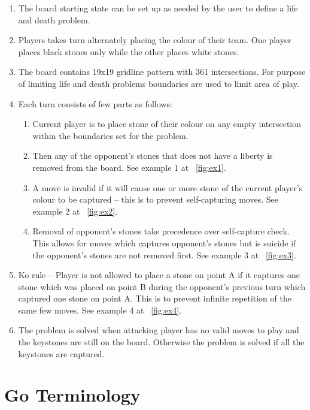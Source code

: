 \documentclass{l4proj}
\begin{document}
\begin{enumerate}
  \item The board starting state can be set up as needed by the user to define a life and death problem.
  \item 	Players takes turn alternately placing the colour of their team. One player places black stones only while the other places white stones.
  \item The board contains 19x19 gridline pattern with 361 intersections. For purpose of limiting life and death problems boundaries are used to limit area of play.
  \item Each turn consists of few parts as follows:
  	\begin{enumerate}[label={(\alph*)}]
		\item Current player is to place stone of their colour on any empty intersection within the boundaries set for the problem.
		\item Then any of the opponent’s stones that does not have a liberty is removed from the board. See example 1 at ~\autoref{fig:ex1}.
		\item A move is invalid if it will cause one or more stone of the current player’s colour to be captured – this is to prevent self-capturing moves. See example 2 at ~\autoref{fig:ex2}.
		\item Removal of opponent’s stones take precedence over self-capture check. This allows for moves which captures opponent’s stones but is suicide if the opponent’s stones are not removed first. See example 3 at ~\autoref{fig:ex3}.
	\end{enumerate}
  \item Ko rule – Player is not allowed to place a stone on point A if it captures one stone which was placed on point B during the opponent’s previous turn which captured one stone on point A. This is to prevent infinite repetition of the same few moves. See example 4 at ~\autoref{fig:ex4}.
  \item The problem is solved when attacking player has no valid moves to play and the keystones are still on the board. Otherwise the problem is solved if all the keystones are captured.


\end{enumerate}




\section{Go Terminology}
\end{document}

